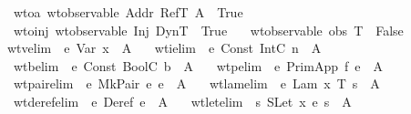 \begin{isabellebody}
\ \ wto{\isacharunderscore}a{\isacharcolon}\ {\isachardoublequoteopen}wt{\isacharunderscore}observable\ Addr\ {\isacharparenleft}RefT\ A{\isacharparenright}\ {\isacharequal}\ True{\isachardoublequoteclose}\ {\isacharbar}\isanewline
\ \ wto{\isacharunderscore}inj{\isacharcolon}\ {\isachardoublequoteopen}wt{\isacharunderscore}observable\ Inj\ DynT\ {\isacharequal}\ True{\isachardoublequoteclose}\ {\isacharbar}\isanewline
\ \ {\isachardoublequoteopen}wt{\isacharunderscore}observable\ obs\ T\ {\isacharequal}\ False{\isachardoublequoteclose}
\isamarkuptrue {}\isamarkupfalse \ wtv{\isacharbrackleft}elim{\isacharbang}{\isacharbrackright}{\isacharcolon}\ {\isachardoublequoteopen}{\isasymGamma}\ {\isasymturnstile}\isactrlisub e\ Var\ x\ {\isacharcolon}\ A{\isachardoublequoteclose}\ \isanewline
\ \ wti{\isacharbrackleft}elim{\isacharbang}{\isacharbrackright}{\isacharcolon}\ {\isachardoublequoteopen}{\isasymGamma}\ {\isasymturnstile}\isactrlisub e\ Const\ {\isacharparenleft}IntC\ n{\isacharparenright}\ {\isacharcolon}\ A{\isachardoublequoteclose}\ \isanewline
\ \ wtb{\isacharbrackleft}elim{\isacharbang}{\isacharbrackright}{\isacharcolon}\ {\isachardoublequoteopen}{\isasymGamma}\ {\isasymturnstile}\isactrlisub e\ Const\ {\isacharparenleft}BoolC\ b{\isacharparenright}\ {\isacharcolon}\ A{\isachardoublequoteclose}\ \isanewline
\ \ wtp{\isacharbrackleft}elim{\isacharbang}{\isacharbrackright}{\isacharcolon}\ {\isachardoublequoteopen}{\isasymGamma}\ {\isasymturnstile}\isactrlisub e\ PrimApp\ f\ e\ {\isacharcolon}\ A{\isachardoublequoteclose}\ \isanewline
\ \ wtpair{\isacharbrackleft}elim{\isacharbang}{\isacharbrackright}{\isacharcolon}\ {\isachardoublequoteopen}{\isasymGamma}\ {\isasymturnstile}\isactrlisub e\ MkPair\ e{}\ e{}\ {\isacharcolon}\ A{\isachardoublequoteclose}\ \isanewline
\ \ wtlam{\isacharbrackleft}elim{\isacharbang}{\isacharbrackright}{\isacharcolon}\ {\isachardoublequoteopen}{\isasymGamma}\ {\isasymturnstile}\isactrlisub e\ Lam\ x\ T\ s\ {\isacharcolon}\ A{\isachardoublequoteclose}\ \isanewline
\ \ wtderef{\isacharbrackleft}elim{\isacharbang}{\isacharbrackright}{\isacharcolon}\ {\isachardoublequoteopen}{\isasymGamma}\ {\isasymturnstile}\isactrlisub e\ {\isacharparenleft}Deref\ e{\isacharparenright}\ {\isacharcolon}\ A{\isachardoublequoteclose}\ \isanewline
\isanewline
{}\isamarkupfalse \isanewline
\ \ wtlet{\isacharbrackleft}elim{\isacharbang}{\isacharbrackright}{\isacharcolon}\ {\isachardoublequoteopen}{\isasymGamma}\ {\isasymturnstile}\isactrlisub s\ SLet\ x\ e\ s\ {\isacharcolon}\ A{\isachardoublequoteclose}\ \isanewline

\end{isabellebody}
